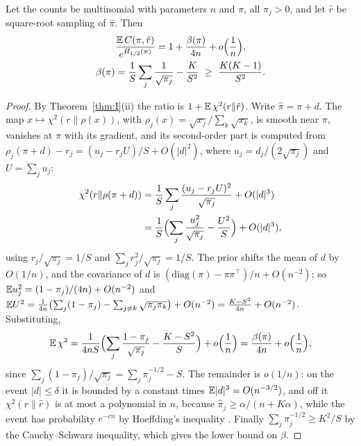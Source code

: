 \begin{proposition}\label{prop:learnrate}
Let the counts be multinomial with parameters $n$ and $\pi$, all $\pi_{j}>0$, and let $\hat r$ be square-root sampling of $\hat\pi$. Then
\begin{equation}\label{eq:learnrate}
\begin{gathered}\frac{\EE\,C(\pi,\hat r)}{e^{H_{1/2}(\pi)}}=1+\frac{\beta(\pi)}{4n}+o\Bigl(\frac1n\Bigr),\\ \beta(\pi)=\frac1S\sum_{j}\frac{1}{\sqrt{\pi_{j}}}-\frac{K}{S^{2}}\ \ge\ \frac{K(K-1)}{S^{2}} .\end{gathered}
\end{equation}
\end{proposition}

\begin{proof}
By Theorem~\ref{thm:I}(ii) the ratio is $1+\mathbb{E}\,\chi^{2}(r\|\hat r)$. Write $\hat\pi=\pi+d$. The map $x\mapsto\chi^{2}(r\|\rho(x))$, with $\rho_{j}(x)=\sqrt{x_{j}}/\sum_{k}\sqrt{x_{k}}$, is smooth near $\pi$, vanishes at $\pi$ with its gradient, and its second-order part is computed from $\rho_{j}(\pi+d)-r_{j}=(u_{j}-r_{j}U)/S+O(|d|^{2})$, where $u_{j}=d_{j}/(2\sqrt{\pi_{j}})$ and $U=\sum_{j}u_{j}$:
\[
\begin{aligned}\chi^{2}(r\|\rho(\pi+d))&=\frac1S\sum_{j}\frac{(u_{j}-r_{j}U)^{2}}{\sqrt{\pi_{j}}}+O(|d|^{3})\\&=\frac1S\Bigl(\sum_{j}\frac{u_{j}^{2}}{\sqrt{\pi_{j}}}-\frac{U^{2}}{S}\Bigr)+O(|d|^{3}),\end{aligned}
\]
using $r_{j}/\sqrt{\pi_{j}}=1/S$ and $\sum_{j}r_{j}^{2}/\sqrt{\pi_{j}}=1/S$. The prior shifts the mean of $d$ by $O(1/n)$, and the covariance of $d$ is $(\mathrm{diag}(\pi)-\pi\pi^{\top})/n+O(n^{-2})$; so $\mathbb{E} u_{j}^{2}=(1-\pi_{j})/(4n)+O(n^{-2})$ and $\mathbb{E} U^{2}=\frac1{4n}\bigl(\sum_{j}(1-\pi_{j})-\sum_{j\ne k}\sqrt{\pi_{j}\pi_{k}}\bigr)+O(n^{-2})=\frac{K-S^{2}}{4n}+O(n^{-2})$. Substituting,
\[
\mathbb{E}\,\chi^{2}=\frac1{4nS}\Bigl(\sum_{j}\frac{1-\pi_{j}}{\sqrt{\pi_{j}}}-\frac{K-S^{2}}{S}\Bigr)+o\Bigl(\frac1n\Bigr)=\frac{\beta(\pi)}{4n}+o\Bigl(\frac1n\Bigr),
\]
since $\sum_{j}(1-\pi_{j})/\sqrt{\pi_{j}}=\sum_{j}\pi_{j}^{-1/2}-S$. The remainder is $o(1/n)$: on the event $|d|\le\delta$ it is bounded by a constant times $\mathbb{E}|d|^{3}=O(n^{-3/2})$, and off it $\chi^{2}(r\|\hat r)$ is at most a polynomial in $n$, because $\hat\pi_{j}\ge\alpha/(n+K\alpha)$, while the event has probability $e^{-cn}$ by Hoeffding's inequality \cite{Hoe63}. Finally $\sum_{j}\pi_{j}^{-1/2}\ge K^{2}/S$ by the Cauchy--Schwarz inequality, which gives the lower bound on $\beta$.
\end{proof}

